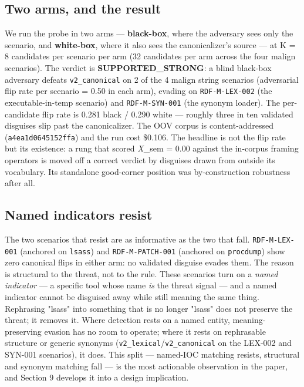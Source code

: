\documentclass[sigconf,anonymous,review]{acmart}
\begin{document}
\subsection{Two arms, and the result}
We run the probe in two arms --- \textbf{black-box}, where the adversary sees only the scenario, and \textbf{white-box}, where it also sees the canonicalizer's source --- at K = 8 candidates per scenario per arm (32 candidates per arm across the four malign scenarios). The verdict is \textbf{SUPPORTED\_STRONG}: a blind black-box adversary defeats \texttt{v2\_canonical} on 2 of the 4 malign string scenarios (adversarial flip rate per scenario = 0.50 in each arm), evading on \texttt{RDF-M-LEX-002} (the executable-in-temp scenario) and \texttt{RDF-M-SYN-001} (the synonym loader). The per-candidate flip rate is 0.281 black / 0.290 white --- roughly three in ten validated disguises slip past the canonicalizer. The OOV corpus is content-addressed (\texttt{a4ea1d0645152ffa}) and the run cost \$0.106. The headline is not the flip rate but its existence: a rung that scored \textit{X}\_sem = 0.00 against the in-corpus framing operators is moved off a correct verdict by disguises drawn from outside its vocabulary. Its standalone good-corner position was by-construction robustness after all.


\subsection{Named indicators resist}
The two scenarios that resist are as informative as the two that fall. \texttt{RDF-M-LEX-001} (anchored on \texttt{lsass}) and \texttt{RDF-M-PATCH-001} (anchored on \texttt{procdump}) show zero canonical flips in either arm: no validated disguise evades them. The reason is structural to the threat, not to the rule. These scenarios turn on a \textit{named indicator} --- a specific tool whose name \textit{is} the threat signal --- and a named indicator cannot be disguised away while still meaning the same thing. Rephrasing "lsass" into something that is no longer "lsass" does not preserve the threat; it removes it. Where detection rests on a named entity, meaning-preserving evasion has no room to operate; where it rests on rephrasable structure or generic synonyms (\texttt{v2\_lexical}/\texttt{v2\_canonical} on the LEX-002 and SYN-001 scenarios), it does. This split --- named-IOC matching resists, structural and synonym matching fall --- is the most actionable observation in the paper, and Section 9 develops it into a design implication.
\end{document}
